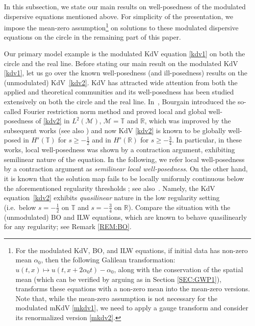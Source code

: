 \documentclass[letterpaper, 11pt,  reqno]{amsart}
\newcommand{\1}{\hspace{0.5mm}\text{I}\hspace{0.5mm}}
\newcommand{\R}{\mathbb{R}}
\newcommand{\T}{\mathbb{T}}
\newcommand{\al}{\alpha}
\newcommand{\M}{\mathcal{M}}
\numberwithin{equation}{section}
\numberwithin{theorem}{section}
\begin{document}
In this subsection, 
we state our main results on well-posedness
of the modulated dispersive equations mentioned above.
For simplicity of the presentation, 
we impose
the mean-zero assumption\footnote{For the modulated KdV, BO, and  ILW equations, 
if initial data has non-zero mean $\al_0$, then the following Galilean transformation:
$u(t, x)\mapsto u (t, x + 2\al_0t)-\al_0$, 
along with the conservation of the spatial mean (which can be verified
by arguing as in Section \ref{SEC:GWP1}), 
transforms
these equations with a non-zero mean into the mean-zero versions.
Note that, while  the mean-zero assumption is not necessary
for the modulated mKdV \eqref{mkdv1},
we need to apply a gauge transform and consider its renormalized version \eqref{mkdv2}.
}
 on solutions to
these modulated dispersive equations on the circle
in the remaining part of this paper.




Our primary model example  is the modulated KdV equation \eqref{kdv1}
on both the circle and the real line.
Before stating our main result on the modulated KdV \eqref{kdv1}, 
let us go over the known well-posedness (and ill-posedness) results
on the (unmodulated) KdV~\eqref{kdv2}.
KdV  has attracted wide attention 
from both the applied and theoretical communities
and its well-posedness has been studied
extensively on both the circle and the real line.
In~\cite{BO93}, 
Bourgain introduced the so-called
 Fourier restriction norm method
and proved local and global well-posedness of \eqref{kdv2}
in $L^2(\M)$, $\M = \T$ and $\R$,
which was
improved
by the subsequent works
\cite{KPV96, CKSTT03, Ki09, G09}
(see also \cite{BK})
and now KdV \eqref{kdv2}
is known to be 
globally well-posed
in $H^s(\T)$ for $s \ge - \frac 12$
and in $H^{s}(\R)$ for $s \ge -\frac 34$.
In particular, in these works, 
local well-posedness was shown by a contraction argument, 
exhibiting semilinear nature of the equation.
In the following, we refer local well-posedness
by a contraction argument 
as {\it semilinear local well-posedness}.
On the other hand, it is known that the solution map
fails to be locally 
uniformly continuous below the aforementioned regularity thresholds
\cite{CCT}; see also~\cite{BO97}.
Namely,  the KdV equation~\eqref{kdv2} exhibits 
{\it quasilinear} nature in the low regularity setting
(i.e.~below $s = -\frac 12$ on $\T$
and $s=- \frac 34$ on $\R$). 
Compare the situation with the (unmodulated) BO and ILW equations, 
which are known to behave quasilinearly 
for any regularity; see Remark \ref{REM:BO}.
\end{document}
